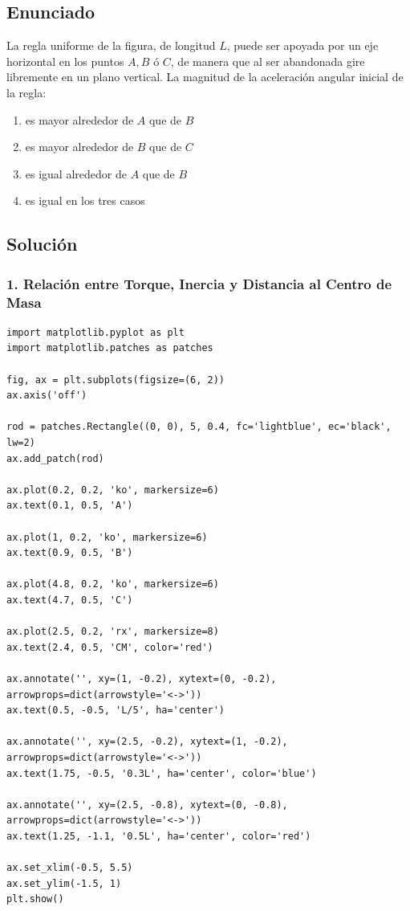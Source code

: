 \documentclass[12pt, a4paper]{article}
\begin{document}
\newpage

\subsection*{Enunciado}
La regla uniforme de la figura, de longitud $L$, puede ser apoyada por un eje horizontal en los puntos $A, B$ ó $C$, de manera que al ser abandonada gire libremente en un plano vertical. La magnitud de la aceleración angular inicial de la regla:
\begin{enumerate}[label=\alph*)]
    \item es mayor alrededor de $A$ que de $B$
    \item es mayor alrededor de $B$ que de $C$
    \item es igual alrededor de $A$ que de $B$
    \item es igual en los tres casos
\end{enumerate}

\subsection*{Solución}

\subsubsection*{1. Relación entre Torque, Inercia y Distancia al Centro de Masa}

\begin{verbatim}
import matplotlib.pyplot as plt
import matplotlib.patches as patches

fig, ax = plt.subplots(figsize=(6, 2))
ax.axis('off')

rod = patches.Rectangle((0, 0), 5, 0.4, fc='lightblue', ec='black', lw=2)
ax.add_patch(rod)

ax.plot(0.2, 0.2, 'ko', markersize=6)
ax.text(0.1, 0.5, 'A')

ax.plot(1, 0.2, 'ko', markersize=6)
ax.text(0.9, 0.5, 'B')

ax.plot(4.8, 0.2, 'ko', markersize=6)
ax.text(4.7, 0.5, 'C')

ax.plot(2.5, 0.2, 'rx', markersize=8)
ax.text(2.4, 0.5, 'CM', color='red')

ax.annotate('', xy=(1, -0.2), xytext=(0, -0.2), arrowprops=dict(arrowstyle='<->'))
ax.text(0.5, -0.5, 'L/5', ha='center')

ax.annotate('', xy=(2.5, -0.2), xytext=(1, -0.2), arrowprops=dict(arrowstyle='<->'))
ax.text(1.75, -0.5, '0.3L', ha='center', color='blue')

ax.annotate('', xy=(2.5, -0.8), xytext=(0, -0.8), arrowprops=dict(arrowstyle='<->'))
ax.text(1.25, -1.1, '0.5L', ha='center', color='red')

ax.set_xlim(-0.5, 5.5)
ax.set_ylim(-1.5, 1)
plt.show()
\end{verbatim}
\end{document}
